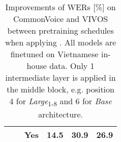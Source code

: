 \begin{table}[!ht]
\begin{adjustbox}{width=0.9\columnwidth,center}
\begin{tabular}{|c|c|c|c|c|c|}
\cline{3-6}
                                   &                                                                                 & Yes                      & 14.5   & 30.9    & 26.9        \\
\hline
\end{tabular}
\end{adjustbox}
\caption{
    Improvements of \glspl{WER} {[}\%{]} on CommonVoice and VIVOS between pretraining schedules when applying . All models are finetuned on Vietnamese in-house data. 
    Only 1 intermediate layer is applied in the middle  block, e.g. position 4 for \textit{Large}\textsubscript{1-8} and 6 for \textit{Base} architecture.}
\label{table:if_loss_cvvivos_pos}
\end{table}